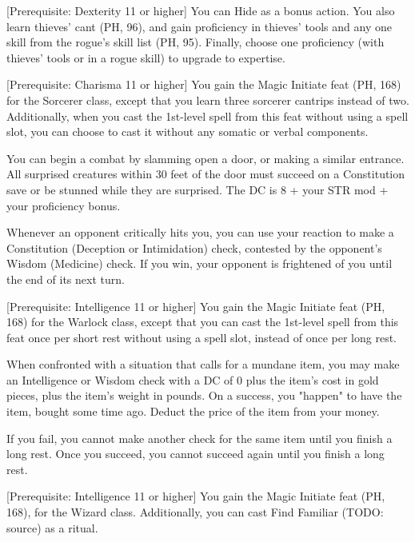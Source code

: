 \documentclass[letterpaper,twocolumn,openany,nodeprecatedcode,bg=print]{dndbook}
\begin{document}
[Prerequisite: Dexterity 11 or higher]
\label{rogue-initiate}
You can Hide as a bonus action. 
You also learn thieves' cant (PH, 96), and gain proficiency in thieves' tools and any one skill from the rogue's skill list (PH, 95).
Finally, choose one proficiency (with thieves' tools or in a rogue skill) to upgrade to expertise.

[Prerequisite: Charisma 11 or higher]
\label{sorcerer-initiate}
You gain the Magic Initiate feat (PH, 168) for the Sorcerer class, except that you learn three sorcerer cantrips instead of two. 
Additionally, when you cast the 1st-level spell from this feat without using a spell slot, you can choose to cast it without any somatic or verbal components.

\label{stunning-irruption}
You can begin a combat by slamming open a door, or making a similar entrance. 
All surprised creatures within 30 feet of the door must succeed on a Constitution save or be stunned while they are surprised. 
The DC is 8 + your STR mod + your proficiency bonus.

\label{tis-but-a-scratch}
Whenever an opponent critically hits you, you can use your reaction to make a Constitution (Deception or Intimidation) check, contested by the opponent's Wisdom (Medicine) check. 
If you win, your opponent is frightened of you until the end of its next turn.

[Prerequisite: Intelligence 11 or higher]
\label{warlock-initiate}
You gain the Magic Initiate feat (PH, 168) for the Warlock class, 
except that you can cast the 1st-level spell from this feat once per short rest without using a spell slot, instead of once per long rest.

\label{well-prepared}
When confronted with a situation that calls for a mundane item, you may make an Intelligence or Wisdom check with a DC of 0 plus the item's cost in gold pieces, plus the item's weight in pounds.
On a success, you "happen" to have the item, bought some time ago. 
Deduct the price of the item from your money. 

If you fail, you cannot make another check for the same item until you finish a long rest. 
Once you succeed, you cannot succeed again until you finish a long rest.

[Prerequisite: Intelligence 11 or higher]
\label{wizard-initiate}
You gain the Magic Initiate feat (PH, 168), for the Wizard class. 
Additionally, you can cast Find Familiar (TODO: source) as a ritual.
\end{document}
